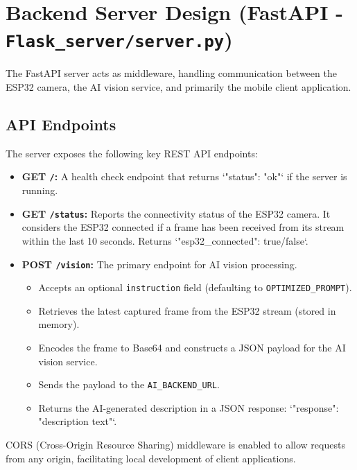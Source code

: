 \documentclass[12pt, a4paper]{report}
\begin{document}
\section{Backend Server Design (FastAPI - \texttt{Flask\_server/server.py})}
The FastAPI server acts as middleware, handling communication between the ESP32 camera, the AI vision service, and primarily the mobile client application.
\subsection{API Endpoints}
The server exposes the following key REST API endpoints:
\begin{itemize}
    \item \textbf{GET \texttt{/}:} A health check endpoint that returns `{"status": "ok"}` if the server is running.
    \item \textbf{GET \texttt{/status}:} Reports the connectivity status of the ESP32 camera. It considers the ESP32 connected if a frame has been received from its stream within the last 10 seconds. Returns `{"esp32\_connected": true/false}`.
    \item \textbf{POST \texttt{/vision}:} The primary endpoint for AI vision processing.
        \begin{itemize}
            \item Accepts an optional \texttt{instruction} field (defaulting to \texttt{OPTIMIZED\_PROMPT}).
            \item Retrieves the latest captured frame from the ESP32 stream (stored in memory).
            \item Encodes the frame to Base64 and constructs a JSON payload for the AI vision service.
            \item Sends the payload to the \texttt{AI\_BACKEND\_URL}.
            \item Returns the AI-generated description in a JSON response: `{"response": "description text"}`.
        \end{itemize}
\end{itemize}
CORS (Cross-Origin Resource Sharing) middleware is enabled to allow requests from any origin, facilitating local development of client applications.
\end{document}
